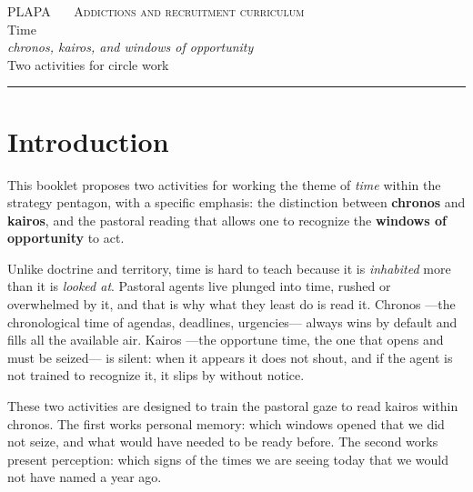 \documentclass[11pt, a4paper]{article}
\begin{document}

\thispagestyle{plain}
\begin{center}
  \vspace*{1.5em}
  {\color{tenue}\scshape\small PLAPA \ \textbullet\ \ Addictions and recruitment curriculum}\\
  \vspace{2em}
  {\color{tiempoAmbar}\Huge Time}\\[0.35em]
  {\color{tinte}\LARGE\itshape chronos, kairos, and windows of opportunity}\\
  \vspace{1.4em}
  {\color{tenue}\large Two activities for circle work}\\
  \vspace{0.6em}
  {\color{regla}\rule{0.35\linewidth}{0.5pt}}
\end{center}

\vspace{2em}

\section*{Introduction}

This booklet proposes two activities for working the theme of \emph{time} within the strategy pentagon, with a specific emphasis: the distinction between \textbf{chronos} and \textbf{kairos}, and the pastoral reading that allows one to recognize the \textbf{windows of opportunity} to act.

Unlike doctrine and territory, time is hard to teach because it is \emph{inhabited} more than it is \emph{looked at}. Pastoral agents live plunged into time, rushed or overwhelmed by it, and that is why what they least do is read it. Chronos ---the chronological time of agendas, deadlines, urgencies--- always wins by default and fills all the available air. Kairos ---the opportune time, the one that opens and must be seized--- is silent: when it appears it does not shout, and if the agent is not trained to recognize it, it slips by without notice.

These two activities are designed to train the pastoral gaze to read kairos within chronos. The first works personal memory: which windows opened that we did not seize, and what would have needed to be ready before. The second works present perception: which signs of the times we are seeing today that we would not have named a year ago.
\end{document}
